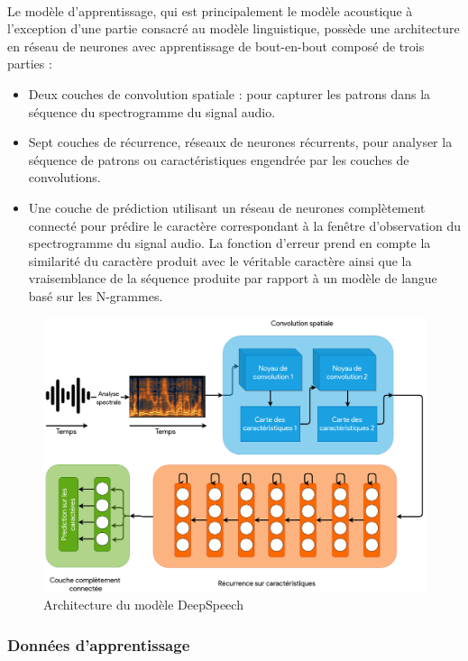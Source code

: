 		\paragraph{}
		Le modèle d'apprentissage, qui est principalement le modèle acoustique à l'exception d'une partie consacré au modèle linguistique, possède une architecture en réseau de neurones avec apprentissage de bout-en-bout composé de trois parties : 
		\begin{itemize}
			\item Deux couches de convolution spatiale : pour capturer les patrons dans la séquence du spectrogramme du signal audio.
			\item Sept couches de récurrence, réseaux de neurones récurrents, pour analyser la séquence de patrons ou caractéristiques engendrée par les couches de convolutions. 
			\item Une couche de prédiction utilisant un réseau de neurones complètement connecté pour prédire le caractère correspondant à la fenêtre d'observation du spectrogramme du signal audio. La fonction d'erreur prend en compte la similarité du caractère produit avec le véritable caractère ainsi que la vraisemblance de la séquence produite par rapport à un modèle de langue basé sur les N-grammes.
		\end{itemize}
		\begin{figure}[H] 
			\centering
			\includegraphics[width=0.88\linewidth]{images/Conception/ASR/deeps_speech_arch.png}
			\caption{Architecture du modèle DeepSpeech \citep{deepspeech_paper}}
			\label{fig:deepSpeechArch}
			
		\end{figure}
		\subsubsection*{Données d'apprentissage}
		\label{common_voice}
